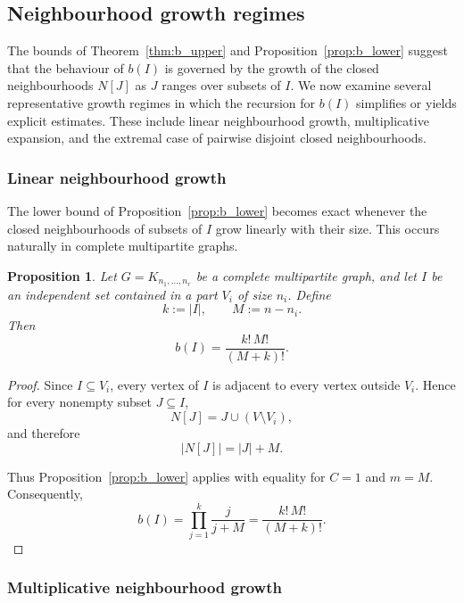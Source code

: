 \documentclass[11pt,a4paper]{article}
\numberwithin{equation}{section}
\theoremstyle{plain}
\newtheorem{proposition}[theorem]{Proposition}
\theoremstyle{definition}
\theoremstyle{remark}
\begin{document}
\subsection{Neighbourhood growth regimes}

The bounds of Theorem~\ref{thm:b_upper} and
Proposition~\ref{prop:b_lower} suggest that the behaviour of
\(b(I)\) is governed by the growth of the closed neighbourhoods
\(N[J]\) as \(J\) ranges over subsets of \(I\).
We now examine several representative growth regimes in which
the recursion for \(b(I)\) simplifies or yields explicit
estimates. These include linear neighbourhood growth,
multiplicative expansion, and the extremal case of pairwise
disjoint closed neighbourhoods.

\subsubsection{Linear neighbourhood growth}
\label{subsec:linear_growth}

The lower bound of Proposition~\ref{prop:b_lower} becomes exact whenever the closed neighbourhoods of subsets of \(I\) grow linearly with their size. This occurs naturally in complete multipartite graphs.

\begin{proposition}
\label{prop:multipartite}
Let
\(
G=K_{n_1,\dots,n_r}
\)
be a complete multipartite graph, and let \(I\) be an independent set contained in a part \(V_i\) of size \(n_i\). Define
\[
k:=|I|,
\qquad
M:=n-n_i.
\]
Then
\[
b(I)=\frac{k!\,M!}{(M+k)!}.
\]
\end{proposition}

\begin{proof}
Since \(I\subseteq V_i\), every vertex of \(I\) is adjacent to every vertex outside \(V_i\). Hence for every nonempty subset \(J\subseteq I\),
\[
N[J]
=
J\cup (V\setminus V_i),
\]
and therefore
\[
|N[J]|=|J|+M.
\]

Thus Proposition~\ref{prop:b_lower} applies with equality for \(C=1\) and \(m=M\). Consequently,
\[
b(I)
=
\prod_{j=1}^{k}
\frac{j}{j+M}
=
\frac{k!\,M!}{(M+k)!}.
\]
\end{proof}

\subsubsection{Multiplicative neighbourhood growth}
\label{subsec:multiplicative_growth}
\end{document}
